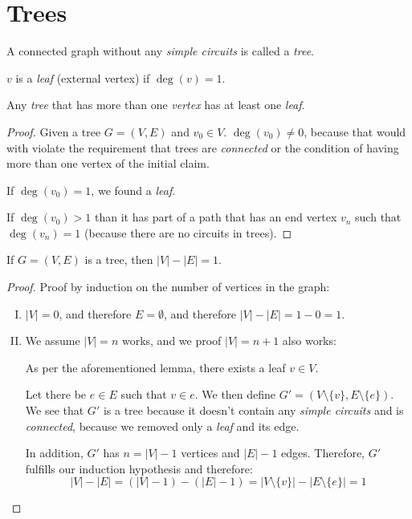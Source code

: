 \documentclass[00_complete]{subfiles}
\begin{document}
\section{Trees}
\begin{definition}[Tree]
    A connected graph without any \emph{simple circuits} is called a
    \emph{tree}.

    $v$ is a \emph{leaf} (external vertex) if $\deg(v)=1$.
\end{definition}
\begin{lemma}
    Any \emph{tree} that has more than one \emph{vertex} has at least one
    \emph{leaf}.
\end{lemma}
\begin{proof}
    Given a tree $G=(V,E)$ and $v_0 \in V$. $\deg(v_0) \neq 0$, because that
    would with violate the requirement that trees are \emph{connected} or the
    condition of having more than one vertex of the initial claim.

    If $\deg(v_0)=1$, we found a \emph{leaf}.

    If $\deg(v_0)>1$ than it has part of a path that has an end vertex $v_n$
    such that $\deg(v_n)=1$ (because there are no circuits in trees).
\end{proof}
\begin{claim}
    If $G=(V,E)$ is a tree, then $|V|-|E|=1$.
\end{claim}
\begin{proof}
   Proof by induction on the number of vertices in the graph:
   \begin{enumerate}[I.]
       \item $|V|=0$, and therefore $E = \emptyset$, and therefore
           $|V|-|E|=1-0=1$.
       \item We assume $|V|=n$ works, and we proof $|V|=n+1$ also works:

        As per the aforementioned lemma, there exists a leaf $v \in V$.

        Let there be $e \in E$ such that $v\in e$. We then define
        $G'=(V\setminus\{v\},E\setminus \{e\})$. We see that $G'$ is a tree
        because it doesn't contain any \emph{simple circuits} and is
        \emph{connected}, because we removed only a \emph{leaf} and its edge.

        In addition, $G'$ has $n=|V|-1$ vertices and $|E|-1$ edges. Therefore, $G'$
        fulfills our induction hypothesis and therefore:
        $$|V|-|E|=(|V|-1)-(|E|-1)=|V\setminus\{v\}|-|E\setminus\{e\}|=1$$
   \end{enumerate}
\end{proof}
\end{document}
